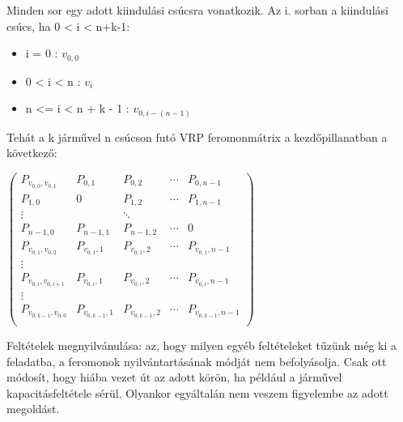Minden sor egy adott kiindulási csúcsra vonatkozik. Az i. sorban a kiindulási csúcs, ha 0 < i < n+k-1:
\begin{itemize}
	\item i = 0 :  \(v_{0,0}\)
	\item 0 < i < n : \(v_i\)
	\item n <= i < n + k - 1 :  \(v_{0,i-(n-1)}\)
\end{itemize}

Tehát a k járművel n csúcson futó VRP feromonmátrix a kezdőpillanatban a következő:

$\begin{pmatrix}
	P_{v_{0,0},v_{0,1}} & P_{0,1} & P_{0,2} & \cdots & P_{0,n-1}\\ 
	P_{1,0} & 0 & P_{1,2} & \cdots & P_{1,n-1} \\
	\vdots & & \ddots \\
	P_{n-1,0} & P_{n-1,1} & P_{n-1,2} & \cdots & 0 \\
	P_{v_{0,1},v_{0,2}} & P_{v_{0,1},1} & P_{v_{0,1},2} & \cdots & P_{v_{0,1},n-1} \\
	\vdots & & \\
	P_{v_{0,i},v_{0,i+1}} & P_{v_{0,i},1} & P_{v_{0,i},2} & \cdots & P_{v_{0,i},n-1} \\
	\vdots & & \\
	P_{v_{0,k-1},v_{0,0}} & P_{v_{0,k-1},1} & P_{v_{0,k-1},2} & \cdots & P_{v_{0,k-1},n-1} \\
\end{pmatrix}$

Feltételek megnyilvánulása: az, hogy milyen egyéb feltételeket tűzünk még ki a feladatba, a feromonok nyilvántartásának módját nem befolyásolja. Csak ott módosít, hogy hiába vezet út az adott körön, ha például a járművel kapacitásfeltétele sérül. Olyankor egyáltalán nem veszem figyelembe az adott megoldást.



